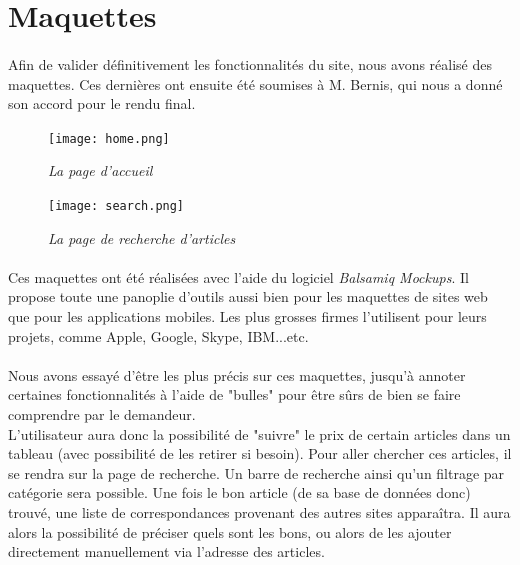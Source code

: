 \documentclass{report}
\begin{document}
\section{Maquettes}

\paragraph{}
Afin de valider définitivement les fonctionnalités du site, nous avons réalisé des maquettes. Ces dernières ont ensuite été soumises à M. Bernis, qui nous a donné son accord pour le rendu final.

\begin{figure}[H]
\begin{center}
\texttt{[image: home.png]}
\caption{\textit{La page d'accueil}}
\end{center}
\end{figure}

\begin{figure}[H]
\begin{center}
\texttt{[image: search.png]}
\caption{\textit{La page de recherche d'articles}}
\end{center}
\end{figure}


\paragraph{}
Ces maquettes ont été réalisées avec l'aide du logiciel \textit{Balsamiq Mockups}. Il propose toute une panoplie d'outils aussi bien pour les maquettes de sites web que pour les applications mobiles. Les plus grosses firmes l'utilisent pour leurs projets, comme Apple, Google, Skype, IBM...etc.

\paragraph{}
Nous avons essayé d'être les plus précis sur ces maquettes, jusqu'à annoter certaines fonctionnalités à l'aide de "bulles" pour être sûrs de bien se faire comprendre par le demandeur.\\
L'utilisateur aura donc la possibilité de "suivre" le prix de certain articles dans un tableau (avec possibilité de les retirer si besoin). Pour aller chercher ces articles, il se rendra sur la page de recherche. Un barre de recherche ainsi qu'un filtrage par catégorie sera possible. Une fois le bon article (de sa base de données donc) trouvé, une liste de correspondances provenant des autres sites apparaîtra. Il aura alors la possibilité de préciser quels sont les bons, ou alors de les ajouter directement manuellement via l'adresse des articles. 
\end{document}
